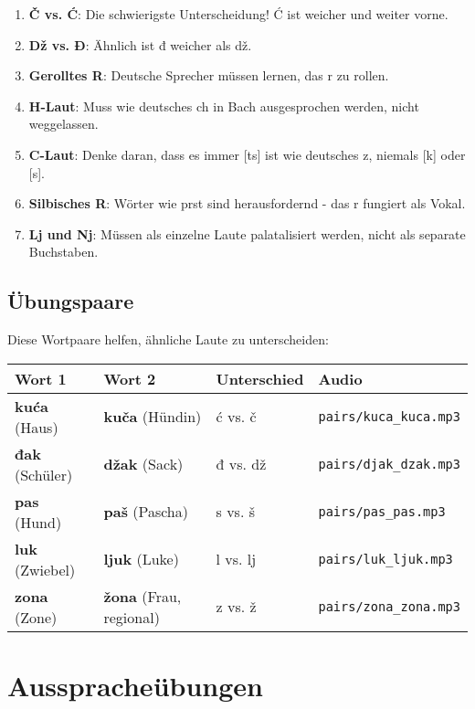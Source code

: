 \begin{enumerate}
    \item \textbf{Č vs. Ć}: Die schwierigste Unterscheidung! Ć ist weicher und weiter vorne.
    \item \textbf{Dž vs. Đ}: Ähnlich ist đ weicher als dž.
    \item \textbf{Gerolltes R}: Deutsche Sprecher müssen lernen, das \glqq r\grqq{} zu rollen.
    \item \textbf{H-Laut}: Muss wie deutsches \glqq ch\grqq{} in \glqq Bach\grqq{} ausgesprochen werden, nicht weggelassen.
    \item \textbf{C-Laut}: Denke daran, dass es immer [ts] ist wie deutsches \glqq z\grqq{}, niemals [k] oder [s].
    \item \textbf{Silbisches R}: Wörter wie \glqq prst\grqq{} sind herausfordernd - das \glqq r\grqq{} fungiert als Vokal.
    \item \textbf{Lj und Nj}: Müssen als einzelne Laute palatalisiert werden, nicht als separate Buchstaben.
\end{enumerate}

\subsection{Übungspaare}

Diese Wortpaare helfen, ähnliche Laute zu unterscheiden:

\begin{center}
\begin{tabular}{llll}
\toprule
\textbf{Wort 1} & \textbf{Wort 2} & \textbf{Unterschied} & \textbf{Audio} \\
\midrule
\textbf{kuća} (Haus) & \textbf{kuča} (Hündin) & ć vs. č & \texttt{pairs/kuca\_kuca.mp3} \\
\textbf{đak} (Schüler) & \textbf{džak} (Sack) & đ vs. dž & \texttt{pairs/djak\_dzak.mp3} \\
\textbf{pas} (Hund) & \textbf{paš} (Pascha) & s vs. š & \texttt{pairs/pas\_pas.mp3} \\
\textbf{luk} (Zwiebel) & \textbf{ljuk} (Luke) & l vs. lj & \texttt{pairs/luk\_ljuk.mp3} \\
\textbf{zona} (Zone) & \textbf{žona} (Frau, regional) & z vs. ž & \texttt{pairs/zona\_zona.mp3} \\
\bottomrule
\end{tabular}
\end{center}

\section{Ausspracheübungen}

